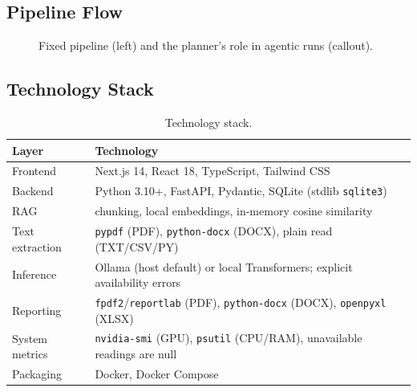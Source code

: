 \documentclass[11pt,a4paper]{article}
\begin{document}
\subsection{Pipeline Flow}
\begin{figure}[htbp]
\centering
{}
\caption{Fixed pipeline (left) and the planner's role in agentic runs (callout).}
\end{figure}

\subsection{Technology Stack}
\begin{table}[htbp]
\centering
\small
\begin{tabular}{@{}p{3.2cm} p{11cm}@{}}
\toprule
\textbf{Layer} & \textbf{Technology} \\
\midrule
Frontend & Next.js 14, React 18, TypeScript, Tailwind CSS \\
Backend & Python 3.10+, FastAPI, Pydantic, SQLite (stdlib \texttt{sqlite3}) \\
RAG & chunking, local embeddings, in-memory cosine similarity \\
Text extraction & \texttt{pypdf} (PDF), \texttt{python-docx} (DOCX), plain read (TXT/CSV/PY) \\
Inference & Ollama (host default) or local Transformers; explicit availability errors \\
Reporting & \texttt{fpdf2}/\texttt{reportlab} (PDF), \texttt{python-docx} (DOCX), \texttt{openpyxl} (XLSX) \\
System metrics & \texttt{nvidia-smi} (GPU), \texttt{psutil} (CPU/RAM), unavailable readings are null \\
Packaging & Docker, Docker Compose \\
\bottomrule
\end{tabular}
\caption{Technology stack.}
\end{table}
\end{document}
